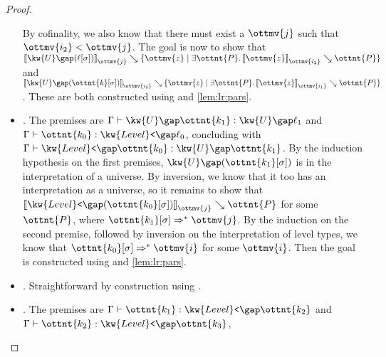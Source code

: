 \documentclass[a4paper,UKenglish,cleveref,autoref,thm-restate]{lipics-v2021}
\begin{document}
\begin{proof}
\begin{itemize}
      By cofinality, we also know that there must exist a $\ottmv{j}$ such that $ \ottmv{i_{{\mathrm{2}}}}  <  \ottmv{j} $.
      The goal is now to show that $ \mathopen{\llbracket}   \kw{U} \gap   (  \ell [  \sigma  ]  )    \mathclose{\rrbracket}_{ \ottmv{j} } \searrow   \lbrace  \ottmv{z}  \mid   \exists  \ottnt{P}  \mathpunct{.}   \mathopen{\llbracket}  \ottmv{z}  \mathclose{\rrbracket}_{ \ottmv{i_{{\mathrm{2}}}} } \searrow  \ottnt{P}    \rbrace  $
      and $ \mathopen{\llbracket}   \kw{U} \gap   (  \ottnt{k} [  \sigma  ]  )    \mathclose{\rrbracket}_{ \ottmv{i_{{\mathrm{2}}}} } \searrow   \lbrace  \ottmv{z}  \mid   \exists  \ottnt{P}  \mathpunct{.}   \mathopen{\llbracket}  \ottmv{z}  \mathclose{\rrbracket}_{ \ottmv{i_{{\mathrm{1}}}} } \searrow  \ottnt{P}    \rbrace  $.
      These are both constructed using  and \cref{lem:lr:pars}.
    \item \textit{.}
      The premises are $ \Gamma  \vdash   \kw{U} \gap  \ottnt{k_{{\mathrm{1}}}}   \mathrel{:}   \kw{U} \gap  \ell_{{\mathrm{1}}}  $ and $ \Gamma  \vdash  \ottnt{k_{{\mathrm{0}}}}  \mathrel{:}   \kw{Level}\texttt{<} \gap  \ell_{{\mathrm{0}}}  $,
      concluding with $ \Gamma  \vdash   \kw{Level}\texttt{<} \gap  \ottnt{k_{{\mathrm{0}}}}   \mathrel{:}   \kw{U} \gap  \ottnt{k_{{\mathrm{1}}}}  $.
      By the induction hypothesis on the first premises,
      $ \kw{U} \gap   (  \ottnt{k_{{\mathrm{1}}}} [  \sigma  ]  )  $ is in the interpretation of a universe.
      By inversion, we know that it too has an interpretation as a universe,
      so it remains to show that $ \mathopen{\llbracket}   \kw{Level}\texttt{<} \gap   (  \ottnt{k_{{\mathrm{0}}}} [  \sigma  ]  )    \mathclose{\rrbracket}_{ \ottmv{j} } \searrow  \ottnt{P} $ for some $\ottnt{P}$,
      where $  \ottnt{k_{{\mathrm{1}}}} [  \sigma  ]   \Rightarrow^\ast   \ottmv{j}  $.
      By the induction on the second premise,
      followed by inversion on the interpretation of level types,
      we know that $  \ottnt{k_{{\mathrm{0}}}} [  \sigma  ]   \Rightarrow^\ast   \ottmv{i}  $ for some $\ottmv{i}$.
      Then the goal is constructed using  and \cref{lem:lr:pars}.
    \item \textit{.} Straightforward by construction using .
    \item \textit{.}
      The premises are $ \Gamma  \vdash  \ottnt{k_{{\mathrm{1}}}}  \mathrel{:}   \kw{Level}\texttt{<} \gap  \ottnt{k_{{\mathrm{2}}}}  $ and $ \Gamma  \vdash  \ottnt{k_{{\mathrm{2}}}}  \mathrel{:}   \kw{Level}\texttt{<} \gap  \ottnt{k_{{\mathrm{3}}}}  $,

\end{itemize}
\end{proof}
\end{document}
